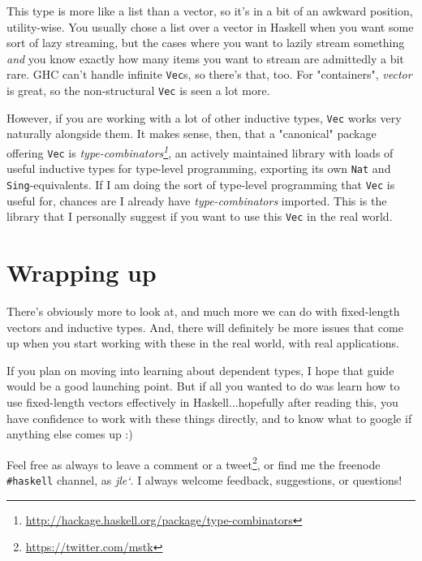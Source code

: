 \documentclass[]{article}
\renewcommand{\href}[2]{#2\footnote{\url{#1}}}
\begin{document}
This type is more like a list than a vector, so it's in a bit of an awkward
position, utility-wise. You usually chose a list over a vector in Haskell when
you want some sort of lazy streaming, but the cases where you want to lazily
stream something \emph{and} you know exactly how many items you want to stream
are admittedly a bit rare. GHC can't handle infinite \texttt{Vec}s, so there's
that, too. For "containers", \emph{vector} is great, so the non-structural
\texttt{Vec} is seen a lot more.

However, if you are working with a lot of other inductive types, \texttt{Vec}
works very naturally alongside them. It makes sense, then, that a "canonical"
package offering \texttt{Vec} is
\emph{\href{http://hackage.haskell.org/package/type-combinators}{type-combinators}},
an actively maintained library with loads of useful inductive types for
type-level programming, exporting its own \texttt{Nat} and
\texttt{Sing}-equivalents. If I am doing the sort of type-level programming that
\texttt{Vec} is useful for, chances are I already have \emph{type-combinators}
imported. This is the library that I personally suggest if you want to use this
\texttt{Vec} in the real world.

\section{Wrapping up}

There's obviously more to look at, and much more we can do with fixed-length
vectors and inductive types. And, there will definitely be more issues that come
up when you start working with these in the real world, with real applications.

If you plan on moving into learning about dependent types, I hope that guide
would be a good launching point. But if all you wanted to do was learn how to
use fixed-length vectors effectively in Haskell...hopefully after reading this,
you have confidence to work with these things directly, and to know what to
google if anything else comes up :)

Feel free as always to leave a comment or a
\href{https://twitter.com/mstk}{tweet}, or find me the freenode
\texttt{\#haskell} channel, as \emph{jle`}. I always welcome feedback,
suggestions, or questions!
\end{document}
